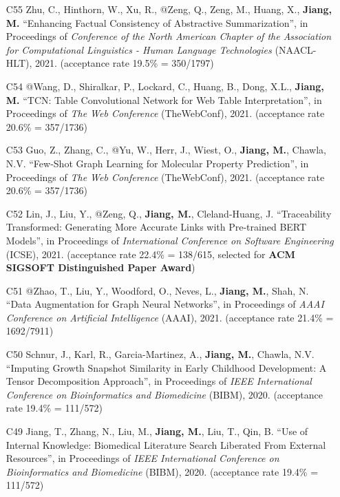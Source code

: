 \documentclass[10pt]{article}
\newenvironment{myindentpar}[1]%
{\begin{list}{}%
         {\setlength{\leftmargin}{#1}}%
         \item[]%
}
{\end{list}}
\newcounter{list}
\begin{document}
\begin{myindentpar}{0.00cm}
\begin{enumerate}[leftmargin=.5cm]
\item[C55] Zhu, C., Hinthorn, W., Xu, R., @Zeng, Q., Zeng, M., Huang, X., \textbf{Jiang, M.} ``Enhancing Factual Consistency of Abstractive Summarization'', in Proceedings of \textit{Conference of the North American Chapter of the Association for Computational Linguistics - Human Language Technologies} (NAACL-HLT), 2021. (acceptance rate 19.5\% = 350/1797)

\item[C54] @Wang, D., Shiralkar, P., Lockard, C., Huang, B., Dong, X.L., \textbf{Jiang, M.} ``TCN: Table Convolutional Network for Web Table Interpretation'', in Proceedings of \textit{The Web Conference} (TheWebConf), 2021. (acceptance rate 20.6\% = 357/1736)

\item[C53] Guo, Z., Zhang, C., @Yu, W., Herr, J., Wiest, O., \textbf{Jiang, M.}, Chawla, N.V. ``Few-Shot Graph Learning for Molecular Property Prediction'', in Proceedings of \textit{The Web Conference} (TheWebConf), 2021. (acceptance rate 20.6\% = 357/1736)

\item[C52] Lin, J., Liu, Y., @Zeng, Q., \textbf{Jiang, M.}, Cleland-Huang, J. ``Traceability Transformed: Generating More Accurate Links with Pre-trained BERT Models'', in Proceedings of \textit{International Conference on Software Engineering} (ICSE), 2021.  (acceptance rate 22.4\% = 138/615, selected for \textbf{ACM SIGSOFT Distinguished Paper Award})

\item[C51] @Zhao, T., Liu, Y., Woodford, O., Neves, L., \textbf{Jiang, M.}, Shah, N. ``Data Augmentation for Graph Neural Networks'', in Proceedings of \textit{AAAI Conference on Artificial Intelligence} (AAAI), 2021. (acceptance rate 21.4\% = 1692/7911)

\item[C50] Schnur, J., Karl, R., Garcia-Martinez, A., \textbf{Jiang, M.}, Chawla, N.V. ``Imputing Growth Snapshot Similarity in Early Childhood Development: A Tensor Decomposition Approach'', in Proceedings of \textit{IEEE International Conference on Bioinformatics and Biomedicine} (BIBM), 2020. (acceptance rate 19.4\% = 111/572)

\item[C49] Jiang, T., Zhang, N., Liu, M., \textbf{Jiang, M.}, Liu, T., Qin, B. ``Use of Internal Knowledge: Biomedical Literature Search Liberated From External Resources'', in Proceedings of \textit{IEEE International Conference on Bioinformatics and Biomedicine} (BIBM), 2020. (acceptance rate 19.4\% = 111/572)


\end{enumerate}
\end{myindentpar}
\end{document}
